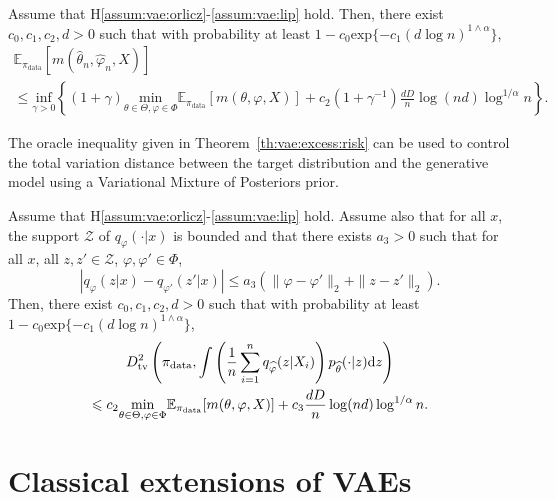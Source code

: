 \documentclass[english,graybox,envcountchap,envcountsame,sectrefs,shortlabels]{svmono}
\theoremstyle{style}
\newcommand{\eqsp}{}
\begin{document}
\begin{theorem}
\label{th:vae:excess:risk}
Assume that H\ref{assum:vae:orlicz}-\ref{assum:vae:lip} hold. Then, there exist $c_0,c_1,c_2,d>0$ such that with probability at least $1- c_0 \mathrm{exp}\{-c_1(d\log n)^{1\wedge \alpha}\}$,
\begin{multline*}
\mathbb{E}_{\pi_{\mathrm{data}}}\left[m(\widehat \theta_n,\widehat\varphi_n,X)\right]\\
\leqslant \underset{\gamma>0}{\mathrm{inf}}\left\{(1+\gamma) \underset{\theta\in\Theta,\varphi\in\Phi}{\mathrm{min}}\mathbb{E}_{\pi_{\mathrm{data}}}[m(\theta,\varphi,X)] + c_2(1+\gamma^{-1})\frac{dD}{n}\log(nd)\log^{1/\alpha}n\right\}\eqsp.
\end{multline*}
\end{theorem}
The oracle inequality given in Theorem~\ref{th:vae:excess:risk} can be used to control the total variation distance between the target distribution and the generative model  using a Variational Mixture of Posteriors prior.
\begin{proposition}
\label{prop:vaemixtprior}
Assume that H\ref{assum:vae:orlicz}-\ref{assum:vae:lip} hold. Assume also that for all $x$, the support $\mathcal{Z}$ of $q_\varphi(\cdot|x)$ is bounded and that there exists $a_3>0$ such that for all $x$, all $z,z'\in \mathcal{Z}$, $\varphi,\varphi'\in\Phi$,
$$
\left|q_\varphi(z|x) - q_{\varphi'}(z'|x)\right| \leqslant a_3 \left( \|\varphi-\varphi'\|_2 + \|z-z'\|_2\right)\eqsp.
$$
Then, there exist $c_0,c_1,c_2,d>0$ such that with probability at least $1- c_0 \mathrm{exp}\{-c_1(d\log n)^{1\wedge \alpha}\}$,
\begin{multline*}
D_{\mathrm{tv}}^2\left(\pi_{\mathrm{data}},\int \left(\frac{1}{n}\sum_{i=1}^n q_{\widehat \varphi}(z|X_i)\right)p_{\widehat \theta}(\cdot|z)\rmd z\right)\\
\leqslant c_2 \underset{\theta\in\Theta,\varphi\in\Phi}{\mathrm{min}}\mathbb{E}_{\pi_{\mathrm{data}}}[m(\theta,\varphi,X)] + c_3\frac{dD}{n}\log(nd)\log^{1/\alpha}n\eqsp.
\end{multline*}
\end{proposition}

\section{Classical extensions of VAEs}
\end{document}
